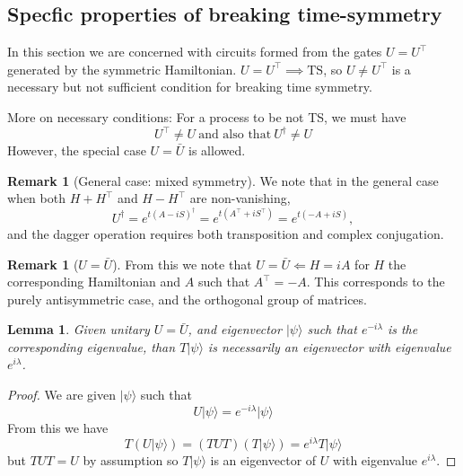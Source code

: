 \documentclass[aps,pra,12pt,nofootinbib,superscriptaddress,longbibliography,showpacs]{revtex4-1}
\theoremstyle{plain}
\newtheorem{lemma}[theorem]{Lemma}
\theoremstyle{definition}
\newtheorem{remark}[theorem]{Remark}
\newcommand{\ket}[1]{\ensuremath{|#1\rangle}}
\newcommand{\be}{\begin{equation}}
\newcommand{\ee}{\end{equation}}
\begin{document}
\subsection{Specfic properties of breaking time-symmetry} 

In this section we are concerned with circuits formed from the gates $U=U^\top$ generated by the symmetric Hamiltonian.  
$U=U^\top \implies \text{TS}$, so $U\neq U^\top$ is a necessary but
not sufficient condition for breaking time symmetry.  

More on necessary conditions:
For a process to be not TS, we must have
\be
U^\top \neq U~\text{and also that}~U^\dagger \neq U 
\ee
However, the special case $U = \bar U$ is allowed.

\begin{remark}[General case: mixed symmetry] 
We note that in the general case
when both $H+H^\top$ and $H-H^\top$ are non-vanishing,
\be
U^\dagger = e^{t (A -i S)^\dagger} = e^{t (A^\top +i S^\top)} = e^{t(-A +iS)},
\ee
and the dagger operation requires both transposition and complex conjugation.
\end{remark} 

\begin{remark}[$U = \bar U$] 
From this we note that $U = \bar U \Leftarrow H = iA$ for $H$
the corresponding Hamiltonian and $A$ such that $A^\top = -A$.  This
corresponds to the purely antisymmetric case, and the orthogonal group
of matrices.
\end{remark} 

\begin{lemma}\label{lemma:complex} 
Given unitary $U=\bar U$, and eigenvector $\ket{\psi}$ such that $e^{-i \lambda}$ is the corresponding eigenvalue, than $T\ket{\psi}$ is necessarily an eigenvector with eigenvalue $e^{i \lambda}$. 
\end{lemma} 
\begin{proof} 
We are given $\ket{\psi}$ such that 
$$ 
U\ket{\psi} = e^{-i \lambda}\ket{\psi}
$$ 
From this we have 
$$ 
T(U\ket{\psi}) = (TUT)(T\ket{\psi} )= e^{i \lambda}T \ket{\psi} 
$$  
but $TUT = U$ by assumption so $T \ket{\psi}$ is an eigenvector of $U$ with eigenvalue $e^{i \lambda}$. 

\end{proof} 



\end{document}
